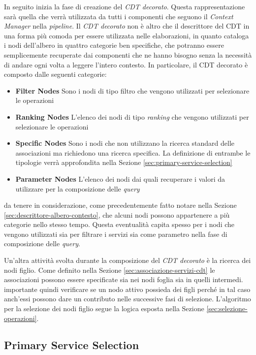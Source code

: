 In seguito inizia la fase di creazione del \emph{CDT decorato}. Questa rappresentazione sarà quella che verrà utilizzata da tutti i componenti che seguono il \emph{Context Manager} nella \emph{pipeline}. Il \emph{CDT decorato} non è altro che il descrittore del CDT in una forma più comoda per essere utilizzata nelle elaborazioni, in quanto cataloga i nodi dell'albero in quattro categorie ben specifiche, che potranno essere semplicemente recuperate dai componenti che ne hanno bisogno senza la necessità di andare ogni volta a leggere l'intero contesto. In particolare, il CDT decorato è composto dalle seguenti categorie:

\begin{itemize}
	\item \textbf{Filter Nodes}
	Sono i nodi di tipo filtro che vengono utilizzati per selezionare le operazioni
	\item \textbf{Ranking Nodes}
	L'elenco dei nodi di tipo \emph{ranking} che vengono utilizzati per selezionare le operazioni
	\item \textbf{Specific Nodes}
	Sono i nodi che non utilizzano la ricerca standard delle associazioni ma richiedono una ricerca specifica. La definizione di entrambe le tipologie verrà approfondita nella Sezione \ref{sec:primary-service-selection}
	\item \textbf{Parameter Nodes}
	L'elenco dei nodi dai quali recuperare i valori da utilizzare per la composizione delle \emph{query}
\end{itemize}

\upe da tenere in considerazione, come precedentemente fatto notare nella Sezione \ref{sec:descrittore-albero-contesto}, che alcuni nodi possono appartenere a più categorie nello stesso tempo. Questa eventualità capita spesso per i nodi che vengono utilizzati sia per filtrare i servizi sia come parametro nella fase di composizione delle \emph{query}.

Un'altra attività svolta durante la composizione del \emph{CDT decorato} è la ricerca dei nodi figlio. Come definito nella Sezione \ref{sec:associazione-servizi-cdt} le associazioni possono essere specificate sia nei nodi foglia sia in quelli intermedi. \upe importante quindi verificare se un nodo attivo possieda dei figli perché in tal caso anch'essi possono dare un contributo nelle successive fasi di selezione. L'algoritmo per la selezione dei nodi figlio segue la logica esposta nella Sezione \ref{sec:selezione-operazioni}.

\subsection{Primary Service Selection\label{sec:primary-service-selection}}

